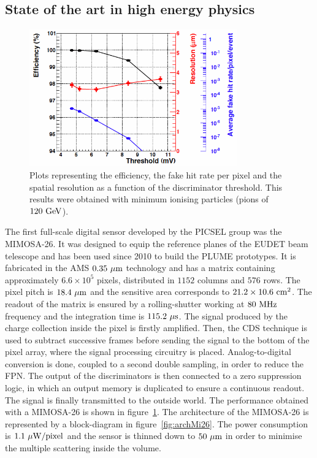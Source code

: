     \subsection{State of the art in high energy physics}
    \label{subsec:Mi26}

    \begin{figure}[!tbh]
      \centering
      \includegraphics[width=0.8\textwidth]{Pictures/vxd/MIMOSA26_chip26_HR15_20deg}
      \caption{Plots representing the efficiency, the fake hit rate per pixel and the spatial resolution as a function of the discriminator threshold. This results were obtained with minimum ionising particles (pions of $120~\rm{GeV}$).}
      \label{fig:mi26Perf}
    \end{figure}

    The first full-scale digital sensor developed by the PICSEL group was the \gls{MIMOSA}-26.
    It was designed to equip the reference planes of the EUDET beam telescope and has been used since 2010 to build the PLUME prototypes.
    It is fabricated in the AMS $0.35~\rm{\mu m}$ technology and has a matrix containing approximately $6.6 \times 10^5$ pixels, distributed in $1152$ columns and $576$ rows.
    The pixel pitch is $18.4~\rm{\mu m}$ and the sensitive area corresponds to $21.2 \times 10.6~\rm{cm}^2$.
    The readout of the matrix is ensured by a rolling-shutter working at $80~\rm{MHz}$ frequency and the integration time is $115.2~\rm{\mu s}$.
    The signal produced by the charge collection inside the pixel is firstly amplified.
    Then, the \gls{CDS} technique is used to subtract successive frames before sending the signal to the bottom of the pixel array, where the signal processing circuitry is placed.
    Analog-to-digital conversion is done, coupled to a second double sampling, in order to reduce the \gls{FPN}.
    The output of the discriminators is then connected to a zero suppression logic, in which an output memory is duplicated to ensure a continuous readout.
    The signal is finally transmitted to the outside world.
    The performance obtained with a \gls{MIMOSA}-26 is shown in figure~\ref{fig:mi26Perf}.
    The architecture of the \gls{MIMOSA}-26 is represented by a block-diagram in figure~\ref{fig:archMi26}.
    The power consumption is $1.1~\rm{\mu W/pixel}$ and the sensor is thinned down to $50~\rm{\mu m}$ in order to minimise the multiple scattering inside the volume.

